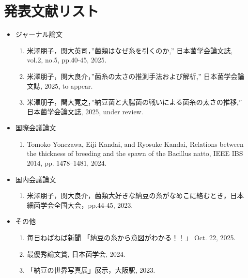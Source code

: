 \chapter*{発表文献リスト}

\begin{itemize}

\item[] ジャーナル論文
\begin{enumerate}
\item 米澤朋子，関大英司，''菌類はなぜ糸を引くのか,'' 日本菌学会論文誌, vol.2, no.5, pp.40-45, 2025.
\item 米澤朋子，関大良介，''菌糸の太さの推測手法および解析,'' 日本菌学会論文誌, 2025, to appear. %
\item 米澤朋子，関大寛之，''納豆菌と大腸菌の戦いによる菌糸の太さの推移,'' 日本菌学会論文誌, 2025, under review. %
\end{enumerate}

\item[] 国際会議論文
\begin{enumerate}
\item Tomoko Yonezawa, Eiji Kandai, and Ryosuke Kandai, 
Relations between the thickness of breeding and the spawn of the Bacillus natto,
IEEE IBS 2014,	pp. 1478--1481,	2024.
\end{enumerate}

\item[] 国内会議論文
\begin{enumerate}
\item 米澤朋子，関大良介，菌類大好きな納豆の糸がなめこに絡むとき，日本細菌学会全国大会，pp.44-45, 2023.
\end{enumerate}

\item[] その他
\begin{enumerate}
\item 毎日ねばねば新聞 「納豆の糸から意図がわかる！！」 Oct. 22, 2025.
\item 最優秀論文賞, 日本菌学会, 2024.
\item 「納豆の世界写真展」展示，大阪駅, 2023.
\end{enumerate}
\end{itemize}

